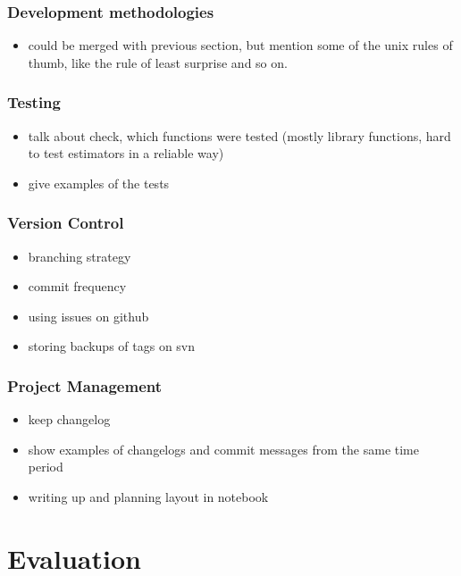 \documentclass[a4paper,11pt]{article}
\begin{document}
\subsubsection{Development methodologies}
\label{sec-6-2-2}

\begin{itemize}
\item could be merged with previous section, but mention some of the unix rules of
  thumb, like the rule of least surprise and so on.
\end{itemize}
\subsubsection{Testing}
\label{sec-6-2-3}

\begin{itemize}
\item talk about check, which functions were tested (mostly library functions, hard
  to test estimators in a reliable way)
\item give examples of the tests
\end{itemize}
\subsubsection{Version Control}
\label{sec-6-2-4}

\begin{itemize}
\item branching strategy
\item commit frequency
\item using issues on github
\item storing backups of tags on svn
\end{itemize}
\subsubsection{Project Management}
\label{sec-6-2-5}

\begin{itemize}
\item keep changelog
\item show examples of changelogs and commit messages from the same time period
\item writing up and planning layout in notebook
\end{itemize}
\section{Evaluation}
\label{sec-7}
\end{document}
